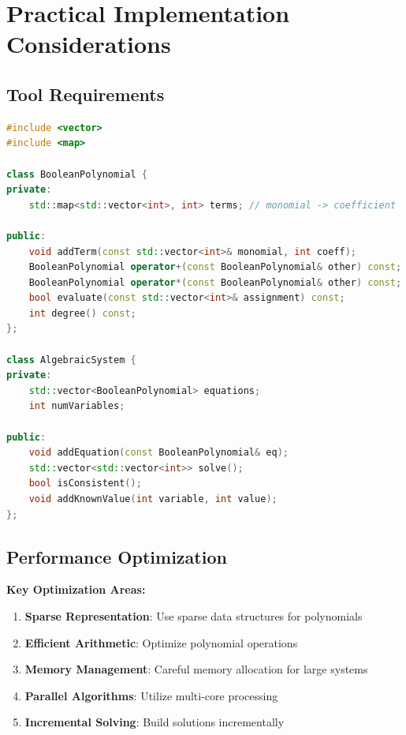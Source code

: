 \documentclass[12pt,a4paper]{article}
\begin{document}
\section{Practical Implementation Considerations}

\subsection{Tool Requirements}

\begin{lstlisting}[language=C++, caption=Basic Polynomial Representation]
#include <vector>
#include <map>

class BooleanPolynomial {
private:
    std::map<std::vector<int>, int> terms; // monomial -> coefficient
    
public:
    void addTerm(const std::vector<int>& monomial, int coeff);
    BooleanPolynomial operator+(const BooleanPolynomial& other) const;
    BooleanPolynomial operator*(const BooleanPolynomial& other) const;
    bool evaluate(const std::vector<int>& assignment) const;
    int degree() const;
};

class AlgebraicSystem {
private:
    std::vector<BooleanPolynomial> equations;
    int numVariables;
    
public:
    void addEquation(const BooleanPolynomial& eq);
    std::vector<std::vector<int>> solve();
    bool isConsistent();
    void addKnownValue(int variable, int value);
};
\end{lstlisting}

\subsection{Performance Optimization}

\begin{algorithmbox}[title=Implementation Optimizations]
\textbf{Key Optimization Areas:}
\begin{enumerate}
    \item \textbf{Sparse Representation}: Use sparse data structures for polynomials
    \item \textbf{Efficient Arithmetic}: Optimize polynomial operations
    \item \textbf{Memory Management}: Careful memory allocation for large systems
    \item \textbf{Parallel Algorithms}: Utilize multi-core processing
    \item \textbf{Incremental Solving}: Build solutions incrementally
\end{enumerate}
\end{algorithmbox}
\end{document}
